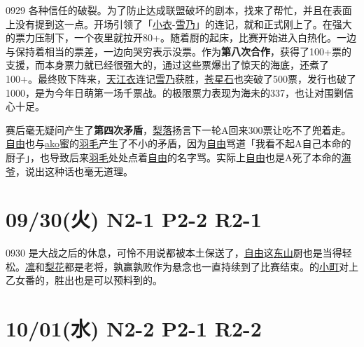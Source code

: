 0929 各种信任的破裂。为了防止达成联盟破坏的剧本，找来了帮忙，并且在表面上没有提到这一点。开场引领了「\uline{小衣}-\uline{雪乃}」的连记，就和正式刚上了。在强大的票力压制下，一个夜里就拉开80+。随着厨的起床，比赛开始进入白热化。一边与保持着相当的票差，一边向哭穷表示没票。作为\textbf{第八次合作}，获得了100+票的支援，而本身票力就已经很强大的，通过这些票爆出了惊天的海底，还煮了100+。最终败下阵来，\uline{天江衣}连记\uline{雪乃}获胜，\uline{苍星石}也突破了500票，发行也破了1000，是为今年日萌第一场千票战。的极限票力表现为海未的337，也让对围剿信心十足。

赛后毫无疑问产生了\textbf{第四次矛盾}，\uline{梨落}扬言下一轮A回来300票让吃不了兜着走。\uline{自由}也与\uline{ako}蜜的\uline{羽毛}产生了不小的矛盾，因为\uline{自由}骂道「我看不起A自己本命的厨子」，也导致后来\uline{羽毛}处处点着\uline{自由}的名字骂。实际上\uline{自由}也是A死了本命的\uline{海爷}，说出这种话也毫无道理。

\section{09/30(火) N2-1 P2-2 R2-1}


0930 是大战之后的休息，可怜不用说都被本土保送了，\uline{自由}这\uline{东山}厨也是当得轻松。\uline{凛}和\uline{梨花}都是老将，孰赢孰败作为悬念也一直持续到了比赛结束。的\uline{小町}对上乙女番的，胜出也是可以预料到的。

\section{10/01(水) N2-2 P2-1 R2-2}

